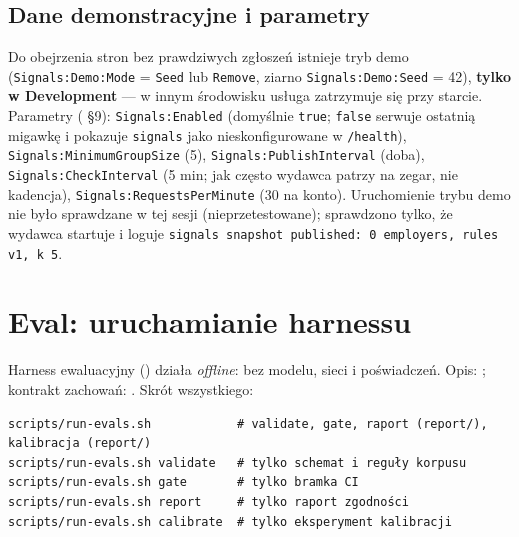 {

\subsection{Dane demonstracyjne i parametry}

Do obejrzenia stron bez prawdziwych zgłoszeń istnieje tryb demo
(\texttt{Signals:\allowbreak{}Demo:\allowbreak{}Mode} = \texttt{Seed} lub \texttt{Remove}, ziarno
\texttt{Signals:\allowbreak{}Demo:\allowbreak{}Seed} = 42), \textbf{tylko w Development} --- w innym
środowisku usługa zatrzymuje się przy starcie. Parametry
( §9): \texttt{Signals:Enabled} (domyślnie
\texttt{true}; \texttt{false} serwuje ostatnią migawkę i pokazuje \texttt{signals}
jako nieskonfigurowane w \texttt{/health}), \texttt{Signals:\allowbreak{}MinimumGroupSize} (5),
\texttt{Signals:\allowbreak{}PublishInterval} (doba), \texttt{Signals:\allowbreak{}CheckInterval}
(5 min; jak często wydawca patrzy na zegar, nie kadencja),
\texttt{Signals:\allowbreak{}RequestsPerMinute} (30 na konto). Uruchomienie trybu demo nie
było sprawdzane w tej sesji (nieprzetestowane); sprawdzono tylko, że wydawca
startuje i loguje \texttt{signals snapshot published: 0 employers, rules v1, k 5}.

\section{Eval: uruchamianie harnessu}

Harness ewaluacyjny () działa
\emph{offline}: bez modelu, sieci i poświadczeń. Opis: ;
kontrakt zachowań: . Skrót wszystkiego:

\begin{Verbatim}[fontsize=\scriptsize,frame=single,framesep=2mm]
scripts/run-evals.sh            # validate, gate, raport (report/), kalibracja (report/)
scripts/run-evals.sh validate   # tylko schemat i reguły korpusu
scripts/run-evals.sh gate       # tylko bramka CI
scripts/run-evals.sh report     # tylko raport zgodności
scripts/run-evals.sh calibrate  # tylko eksperyment kalibracji
\end{Verbatim}

}
